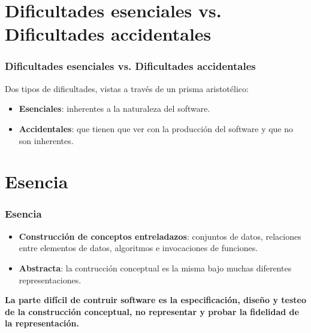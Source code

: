 \documentclass{beamer}
\begin{document}
\section{Dificultades esenciales vs. Dificultades accidentales}
\begin{frame}
\frametitle{Dificultades esenciales vs. Dificultades accidentales}

Dos tipos de dificultades, vistas a través de un prisma aristotélico:\\
	\begin{itemize}
		\item \textbf{Esenciales}: inherentes a la naturaleza del software.
		\item \textbf{Accidentales}: que tienen que ver con la producción del software y que no son inherentes.
				
	\end{itemize}
\end{frame}

\section{Esencia}
\begin{frame}
\frametitle{Esencia}

	\begin{itemize}
		\item \textbf{Construcción de conceptos entreladazos}: conjuntos de datos, relaciones entre elementos de datos, algoritmos e invocaciones de funciones.
		\item \textbf{Abstracta}: la contrucción conceptual es la misma bajo muchas diferentes representaciones.				
	\end{itemize}

\textbf{La parte difícil de contruir software es la especificación, diseño y testeo de la construcción conceptual, no representar y probar la fidelidad de la representación.}
\end{frame}
\end{document}
